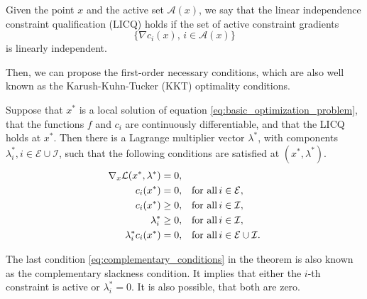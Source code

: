         \begin{definition}[LICQ]
            \label{def:licq}
            Given the point $x$ and the active set $\mathcal{A}(x)$, we say that the linear independence constraint qualification (LICQ) holds if the set of active constraint gradients
                $$
                    \{ \nabla c_{i}(x), \, i \in \mathcal{A}(x) \}
                $$
            is linearly independent.
        \end{definition}

        Then, we can propose the first-order necessary conditions, which are also well known as the Karush-Kuhn-Tucker (KKT) optimality conditions.

        \begin{theorem}
        \label{the:kkt_conditions}
            Suppose that $x^{\ast}$ is a local solution of equation \ref{eq:basic_optimization_problem}, that the
            functions $f$ and $c_{i}$ are continuously differentiable, and that the LICQ holds at $x^{\ast}$. Then there is a Lagrange multiplier vector $\lambda^{\ast}$, with components $\lambda_{i}^{\ast}, i \in \mathcal{E} \cup \mathcal{I}$, such that the following conditions are satisfied at $(x^{\ast}, \lambda^{\ast})$.
            \begin{subequations}
                \begin{align}
                    \nabla_{x}\mathcal{L}(x^{\ast}, \lambda^{\ast}) &= 0, \label{eq:stationarity} \\
                    c_{i}(x^{\ast}) &= 0, \,\,\,\,\, \textnormal{for all} \, i \in \mathcal{E}, \\
                    c_{i}(x^{\ast}) &\ge 0, \,\,\,\,\, \textnormal{for all} \, i \in \mathcal{I}, \\
                    \lambda_{i}^{\ast} &\ge 0, \,\,\,\,\, \textnormal{for all} \, i \in \mathcal{I}, \\
                    \lambda_{i}^{\ast}c_{i}(x^{\ast}) &= 0, \,\,\,\,\, \textnormal{for all} \, i \in \mathcal{E} \cup \mathcal{I}.\label{eq:complementary_conditions}
                \end{align}
                \label{eq:kkt_conditions}
            \end{subequations}
        \end{theorem}

        \begin{remark}
            The last condition \ref{eq:complementary_conditions} in the theorem is also known as the complementary slackness condition. It implies that either the $i$-th constraint is active or $\lambda_{i}^{\ast} = 0$. It is also possible, that both are zero.
        \end{remark}

